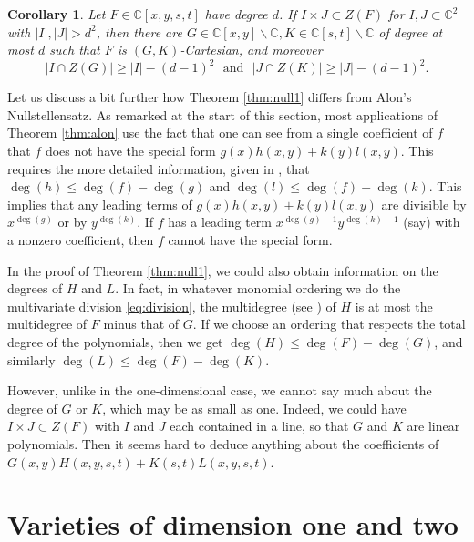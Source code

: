\documentclass{daj}
\newtheorem{corollary}[theorem]{Corollary}
\theoremstyle{definition}
\newcommand{\C}{\mathbb C}
\begin{document}
\begin{corollary}\label{cor:null2}
Let $F\in \C[x,y,s,t]$ have degree $d$.
If $I\times J\subset Z(F)$ for $I,J\subset \C^2$ with $|I|,|J|>d^2$, 
then there are $G\in \C[x,y]\backslash\C,K\in\C[s,t]\backslash\C$ of degree at most $d$ such that $F$ is $(G,K)$-Cartesian, 
 and moreover 
 \[|I\cap Z(G)|\geq |I|-(d-1)^2~~~\text{and}~~~|J\cap Z(K)|\geq |J|-(d-1)^2.\]
\end{corollary}


Let us discuss a bit further how Theorem \ref{thm:null1} differs from Alon's Nullstellensatz.
As remarked at the start of this section,
most applications of Theorem \ref{thm:alon} use the fact that one can see from a single coefficient of $f$ that $f$ does not have the special form $g(x)h(x,y)+k(y)l(x,y)$.
This requires the more detailed information, given in \cite[Theorem 1.1]{A}, that $\deg(h)\leq \deg(f) - \deg(g)$ and $\deg(l)\leq \deg(f) - \deg(k)$.
This implies that any leading terms of $g(x)h(x,y)+k(y)l(x,y)$ are divisible by $x^{\deg(g)}$ or by $y^{\deg(k)}$.
If $f$ has a leading term $x^{\deg(g)-1}y^{\deg(k)-1}$ (say) with a nonzero coefficient, then $f$ cannot have the special form.

In the proof of Theorem \ref{thm:null1}, we could also obtain information on the degrees of $H$ and $L$.
In fact, in whatever monomial ordering we do the multivariate division \eqref{eq:division},
the multidegree (see \cite[Chapter 2]{CLOS}) of $H$ is at most the multidegree of $F$ minus that of $G$.
If we choose an ordering that respects the total degree of the polynomials, then we get $\deg(H)\leq \deg(F) - \deg(G)$, and similarly $\deg(L)\leq \deg(F) - \deg(K)$.

However, unlike in the one-dimensional case, 
we cannot say much about the degree of $G$ or $K$, which may be as small as one.
Indeed, we could have $I\times J\subset Z(F)$ with $I$ and $J$ each contained in a line, so that $G$ and $K$ are linear polynomials.
Then it seems hard to deduce anything about the coefficients of $G(x,y)H(x,y,s,t)+ K(s,t)L(x,y,s,t)$.




\section{Varieties of dimension one and two}
\label{sec:dimtwo}
\end{document}
